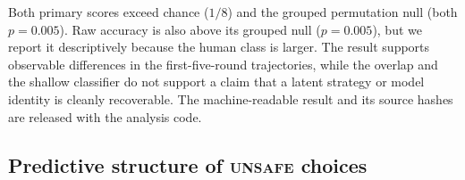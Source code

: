 \documentclass{article}
\newcommand{\Unsafe}{\textsc{unsafe}}
\begin{document}
\begin{table}[t]
    \caption{Dyad/race-grouped population-identity diagnostic on 760 complete
    first-five-round trajectories. The human population has 340 trajectories
    and each of the seven listed checkpoints has 60; the classes are therefore
    imbalanced, so balanced accuracy and macro-F1 are primary. The null interval
    is the 2.5--97.5 percentile range over grouped label permutations.}
    \label{tab:population-identity}
    \centering
    \scriptsize
    \setlength{\tabcolsep}{3pt}
\end{table}

Both primary scores exceed chance ($1/8$) and the grouped permutation null
(both $p=0.005$). Raw accuracy is also above its grouped null ($p=0.005$),
but we report it descriptively because the human class is larger. The result
supports observable differences in the first-five-round trajectories, while
the overlap and the shallow classifier do not support a claim that a latent
strategy or model identity is cleanly recoverable. The machine-readable
result and its source hashes are released with the analysis code.

\subsection{Predictive structure of \Unsafe{} choices}
\label{app:predictive-structure}
\end{document}
